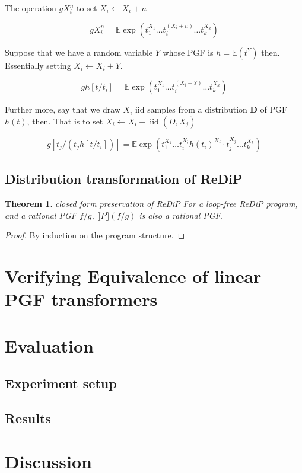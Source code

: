 \documentclass[a4paper]{article}
\DeclareMathOperator*{\iid}{iid}
\renewcommand{\S}[1]{ \llbracket #1 \rrbracket }
\newtheorem{theorem}{Theorem}[section]
\begin{document}
The operation \(g X_i^n\) to set \(X_i \gets X_i + n\)

\[
	g X_i^n = \mathbb{E} \exp\left( t_1^{X_1} \ldots t_i^{(X_i+n)}\ldots t_k^{X_k} \right)
\]

Suppose that we have a random variable \(Y\) whose PGF is \(h = \mathbb{E}(t^Y)\) then. Essentially setting \(X_i \gets X_i + Y\).

\[
	g h[t/t_i] = \mathbb{E} \exp\left( t_1^{X_1} \ldots t_i^{(X_i+Y)}\ldots t_k^{X_k} \right)
\]

Further more, say that we draw \(X_i\) iid samples from a distribution \(\mathbf{D}\) of PGF \(h(t)\), then. That is to set \(X_i \gets X_i + \iid(D, X_j)\)

\[
	g[t_j / (t_j h[t/t_i])] = 
	\mathbb{E} \exp\left( t_1^{X_1} \ldots t_i^{X_i} h(t_i)^{X_j} \cdot t_j^{X_j}\ldots t_k^{X_k} \right)
\]

\subsection{Distribution transformation of ReDiP}

\begin{theorem}{closed form preservation of ReDiP}
	For a loop-free ReDiP program, and a rational PGF \(f/g\),
	\(\S{P}(f/g)\) is also a rational PGF.
\end{theorem}
\begin{proof}
	By induction on the program structure.
\end{proof}

\section{Verifying Equivalence of linear PGF transformers}

\section{Evaluation}

\subsection{Experiment setup}

\subsection{Results}

\section{Discussion}
\end{document}
